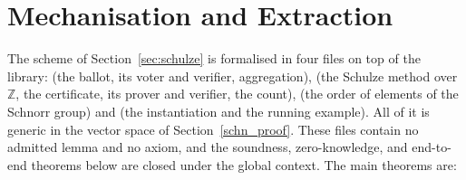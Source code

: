 \section{Mechanisation and Extraction}\label{sec:mech}
The scheme of Section~\ref{sec:schulze} is formalised in four files on
top of the library:  (the ballot, its voter and
verifier, aggregation),  (the Schulze
method over $\mathbb{Z}$, the certificate, its prover and verifier, the
count),  (the order of elements of the
Schnorr group) and  (the instantiation and
the running example). All of it is generic in the vector space of
Section~\ref{schn_proof}. These files contain no admitted lemma and no
axiom, and the soundness, zero-knowledge, and end-to-end theorems below
are closed under the global context. The
main theorems are:
